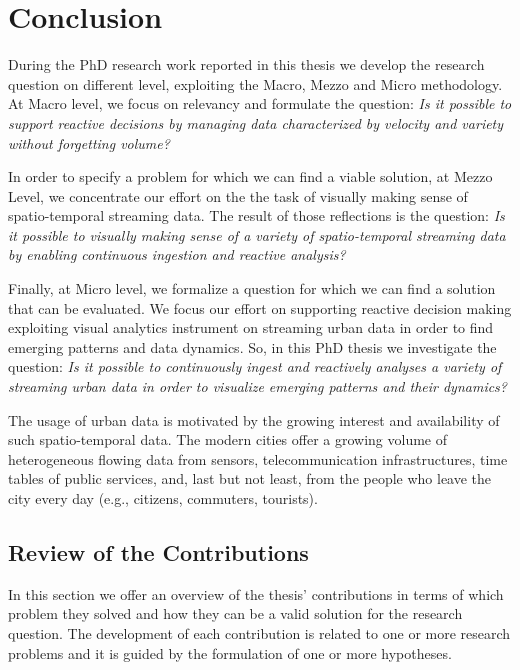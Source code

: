 \chapter{Conclusion}\label{ch:conclusion}

During the PhD research work reported in this thesis we develop the research question on different level, exploiting the Macro, Mezzo and Micro methodology.
At Macro level, we focus on relevancy and formulate the question: \textit{Is it possible to support reactive decisions by managing data characterized by velocity and variety without forgetting volume?}

In order to specify a problem for which we can find a viable solution, at Mezzo Level, we concentrate our effort on the 
the task of visually making sense of spatio-temporal streaming data. The result of those reflections is the question: \textit{Is it possible to visually making sense of a variety of spatio-temporal streaming data by enabling continuous ingestion and reactive analysis?}

Finally, at Micro level, we formalize a question for which we can find a solution that can be evaluated.
We focus our effort on supporting reactive decision making exploiting visual analytics instrument on streaming urban data in order to find emerging patterns and data dynamics.
So, in this PhD thesis we investigate the question: \textit{Is it possible to continuously ingest and reactively analyses a variety of streaming urban data in order to visualize emerging patterns and their dynamics?}

The usage of urban data is motivated by the growing interest and availability of such spatio-temporal data.
The modern cities offer a growing volume of heterogeneous flowing data from sensors, telecommunication infrastructures, time tables of public services, and, last but not least, from the people who leave the city every day (e.g., citizens, commuters, tourists).


\section{Review of the Contributions}

In this section we offer an overview of the thesis' contributions in terms of which problem they solved and how they can be a valid solution for the research question.
The development of each contribution is related to one or more research problems and it is guided by the formulation of one or more hypotheses.


